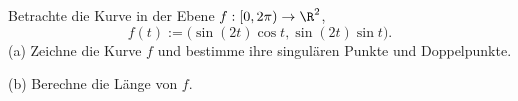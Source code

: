 \begin{prob}
Betrachte die Kurve in der Ebene $f:[0,2\pi)\to\R^2$, 
$$
   f(t) := \bigl(\sin(2t)\cos t,\sin(2t)\sin t\bigr).
$$
(a) Zeichne die Kurve $f$ und bestimme ihre singul\"aren Punkte und
Doppelpunkte. 

(b) Berechne die L\"ange von $f$. 
\end{prob}
